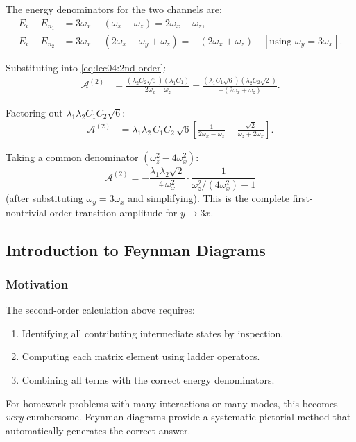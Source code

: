 The energy denominators for the two channels are:
\begin{align}
  E_i - E_{n_1}
  &= 3\omega_x - (\omega_x + \omega_z)
   = 2\omega_x - \omega_z,\\
  E_i - E_{n_2}
  &= 3\omega_x - (2\omega_x + \omega_y + \omega_z)
   = -(2\omega_x + \omega_z)
   \quad [\text{using }\omega_y = 3\omega_x].
\label{eq:lec04:energy-denominators}
\end{align}

Substituting into \eqref{eq:lec04:2nd-order}:
\begin{align}
  \mathcal{A}^{(2)}
  &= \frac{(\lambda_2 C_2 \sqrt{6})(\lambda_1 C_1)}{2\omega_x - \omega_z}
   + \frac{(\lambda_1 C_1 \sqrt{6})(\lambda_2 C_2\sqrt{2})}
          {-(2\omega_x + \omega_z)}.
  \label{eq:lec04:amp-full}
\end{align}

Factoring out $\lambda_1 \lambda_2 C_1 C_2 \sqrt{6}$:
\begin{align}
  \mathcal{A}^{(2)}
  &= \lambda_1 \lambda_2\, C_1 C_2\,\sqrt{6}
    \left[
      \frac{1}{2\omega_x - \omega_z}
      - \frac{\sqrt{2}}{\omega_z + 2\omega_x}
    \right].
  \label{eq:lec04:amp-factored}
\end{align}

Taking a common denominator $(\omega_z^2 - 4\omega_x^2)$:
\begin{equation}
  \boxed{
    \mathcal{A}^{(2)}
    = -\frac{\lambda_1\lambda_2\sqrt{2}}{4\,\omega_x^2}
      \cdot\frac{1}{\omega_z^2/(4\omega_x^2) - 1}
  }
  \label{eq:lec04:amp-final}
\end{equation}
(after substituting $\omega_y = 3\omega_x$ and simplifying).  This is the complete first-nontrivial-order transition amplitude for $y \to 3x$.

\subsection*{Introduction to Feynman Diagrams}

\subsubsection*{Motivation}

The second-order calculation above requires:
\begin{enumerate}
  \item Identifying all contributing intermediate states by inspection.
  \item Computing each matrix element using ladder operators.
  \item Combining all terms with the correct energy denominators.
\end{enumerate}
For homework problems with many interactions or many modes, this becomes \emph{very} cumbersome.  Feynman diagrams provide a systematic pictorial method that automatically generates the correct answer.

